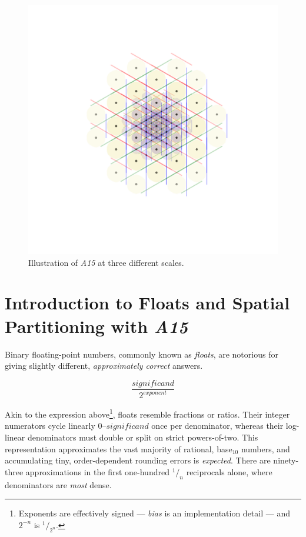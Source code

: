 \documentclass[10pt]{article}
\def\AAAB{\textit{A15}}
\begin{document}
\begin{figure}[!ht]\capstart \includegraphics[trim=150 150 150 155,scale=.75]{fig-intro}\caption{Illustration of \AAAB{} at three
different scales. \label{fig-intro}}\end{figure}


\section{Introduction to Floats and Spatial Partitioning with \AAAB}\label{introduction-to-floats-and-spatial-partitioning-with-a15}

Binary floating-point numbers, commonly known as \emph{floats}, are notorious for giving slightly different, \emph{approximately
correct} answers.

\[\dfrac{\mathit{\scriptstyle significand}}{2^{\mathit{exponent}}}\]

Akin to the expression above\footnote{Exponents are effectively signed --- \emph{bias} is an implementation detail --- and $2^{-n}$
is $^1/_{2^n}$.}, floats resemble fractions or ratios. Their integer numerators cycle linearly $0$--$\mathit{significand}$ once
per denominator, whereas their log-linear denominators must double or split on strict powers-of-two. This representation
approximates the vast majority of rational, base$_{10}$ numbers, and accumulating tiny, order-dependent rounding errors is
\emph{expected}. There are ninety-three approximations in the first one-hundred $^1/_n$ reciprocals alone, where denominators are
\emph{most} dense.
\end{document}
